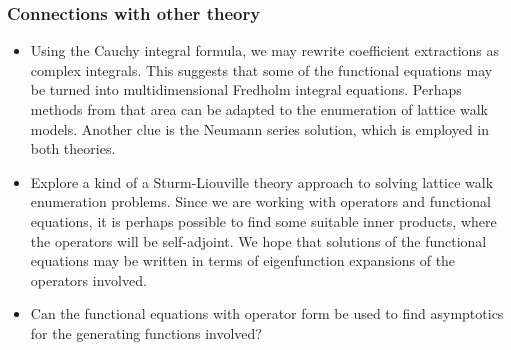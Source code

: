 \subsubsection{Connections with other theory}
\begin{itemize}
	\item Using the Cauchy integral formula, we may rewrite coefficient extractions as complex integrals. This suggests that some of the functional equations may be turned into multidimensional Fredholm integral equations. Perhaps methods from that area can be adapted to the enumeration of lattice walk models. Another clue is the Neumann series solution, which is employed in both theories.
	\item Explore a kind of a Sturm-Liouville theory approach to solving lattice walk enumeration problems. Since we are working with operators and functional equations, it is perhaps possible to find some suitable inner products, where the operators will be self-adjoint. We hope that solutions of the functional equations may be written in terms of eigenfunction expansions of the operators involved.
	\item Can the functional equations with operator form be used to find asymptotics for the generating functions involved?
\end{itemize}
\endinput
